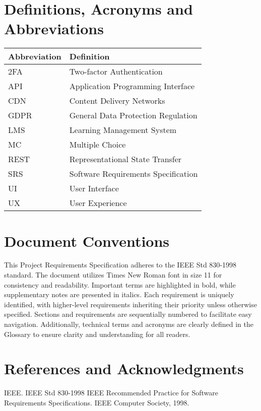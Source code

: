 \documentclass[a4paper, 11pt]{scrreprt}
\begin{document}
\section{Definitions, Acronyms and Abbreviations}
\begin{center}
    \begin{tabularx}{\textwidth}{lX}
        \toprule
        \textbf{Abbreviation} & \textbf{Definition} \\
        \midrule
        2FA & Two-factor Authentication \\
        API & Application Programming Interface \\
        CDN & Content Delivery Networks \\
        GDPR & General Data Protection Regulation \\
        LMS & Learning Management System \\
        MC & Multiple Choice \\
        REST & Representational State Transfer \\
        SRS & Software Requirements Specification \\
        UI & User Interface \\
        UX & User Experience \\
        \bottomrule
    \end{tabularx}
\end{center}


\section{Document Conventions}
This Project Requirements Specification adheres to the IEEE Std 830-1998 standard. The document utilizes Times New Roman font in size 11 for consistency and readability. Important terms are highlighted in bold, while supplementary notes are presented in italics. Each requirement is uniquely identified, with higher-level requirements inheriting their priority unless otherwise specified. Sections and requirements are sequentially numbered to facilitate easy navigation. Additionally, technical terms and acronyms are clearly defined in the Glossary to ensure clarity and understanding for all readers.

\section{References and Acknowledgments}
IEEE. IEEE Std 830-1998 IEEE Recommended Practice for Software Requirements Specifications. IEEE Computer Society, 1998.
\end{document}
